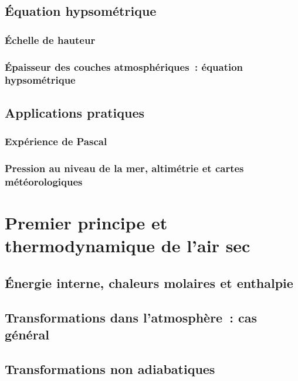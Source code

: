 	\sk \subsection{\'Equation hypsométrique}

		\sk \subsubsection{\'Echelle de hauteur}
		

		\sk \subsubsection{\'Epaisseur des couches atmosphériques~: équation hypsométrique}
		

	\sk \subsection{Applications pratiques}

		\sk \subsubsection{Expérience de Pascal}
		

		\sk \subsubsection{Pression au niveau de la mer, altimétrie et cartes météorologiques}
		

\mk \section{Premier principe et thermodynamique de l'air sec} 

	\sk \subsection{\'Energie interne, chaleurs molaires et enthalpie}
	

	\sk \subsection{Transformations dans l'atmosphère~: cas général}
	

	\sk \subsection{Transformations non adiabatiques}
	


